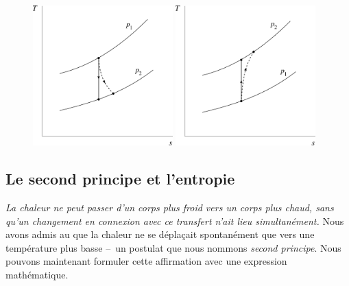 		\begin{figure}
			\begin{center}
				\includegraphics[width=0.48\textwidth]{images/ts_gp_detente.png}
				\includegraphics[width=0.48\textwidth]{images/ts_gp_compression.png}
			\end{center}
			\label{fig_t-s_détentes_compressions}
		\end{figure}

		

	\subsection{Le second principe et l’entropie}

			\emph{La chaleur ne peut passer d’un corps plus froid vers un corps plus chaud, sans qu’un changement en connexion avec ce transfert n’ait lieu simultanément.}
		Nous avons admis au \courssept que la chaleur ne se déplaçait spontanément que vers une température plus basse --\ un postulat que nous nommons \textit{second principe}. Nous pouvons maintenant formuler cette affirmation avec une expression mathématique.
	

